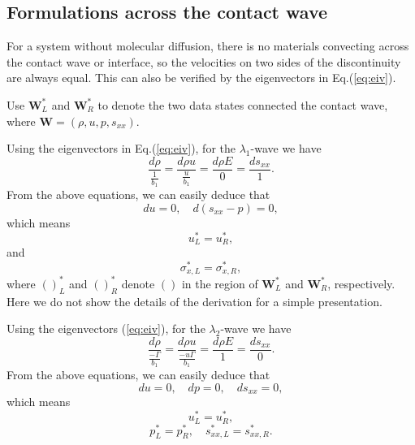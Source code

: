 \documentclass[review]{elsarticle}
\begin{document}
\subsection{Formulations across the  contact wave}
  For  a  system without molecular diffusion, there is no materials convecting  across the contact wave or interface, so the velocities on two sides of  the discontinuity are always equal. %
  This can also be verified by the eigenvectors  in Eq.(\ref{eq:eiv}).

Use $\mathbf{W}_L^*$ and $\mathbf{W}_R^*$ to denote the two data states connected the contact wave, where $\mathbf{W}=\left(\rho,u,p,s_{xx}\right)$.

Using the eigenvectors in  Eq.(\ref{eq:eiv}), for the $\lambda_{1}$-wave we
have
\begin{equation}   \label{e23a}
\frac{d \rho}{\frac{1}{b_{1}}} = \frac{d \rho u}{\frac{u
}{b_{1}}}=\frac{d \rho E}{0} = \frac{d s_{xx}}{1}.
\end{equation}
From the above equations, we can easily deduce that
\begin{equation}   \label{e23b}
du = 0, \quad d(s_{xx}-p)=0,
\end{equation}
 which means
\begin{equation}   \label{e23c}
  u_{L}^{\ast}=u_{R}^{\ast},
\end{equation}
and
\begin{equation}   \label{e23d}
\sigma_{x,L}^{\ast}=\sigma_{x,R}^{\ast},
\end{equation}
where $()_{L}^{\ast}$ and $()_{R}^{\ast}$ denote $()$ in the region
of $\mathbf{W}_{L}^{\ast}$ and $\mathbf{W}_{R}^{\ast}$,
respectively. Here we do not show the details of the derivation for a simple
 presentation.


Using the eigenvectors (\ref{eq:eiv}), for the $\lambda_{2}$-wave we
have
\begin{equation}   \label{e24a}
\frac{d \rho}{\frac{-\Gamma}{b_{1}}} = \frac{d \rho u}{\frac{-u
\Gamma}{b_{1}}}=\frac{d \rho E}{1} = \frac{d s_{xx}}{0}.
\end{equation}
From the above equations, we can easily deduce  that
\begin{equation}   \label{e24b}
du = 0, \quad dp=0, \quad ds_{xx}=0,
\end{equation}
 which means
\begin{equation}   \label{e24c}
  u_{L}^{\ast}=u_{R}^{\ast},
\end{equation}
\begin{equation}   \label{e24d}
p_{L}^{\ast}=p_{R}^{\ast}, \quad
  s_{xx,L}^{\ast}=s_{xx,R}^{\ast}.
\end{equation}
\end{document}
